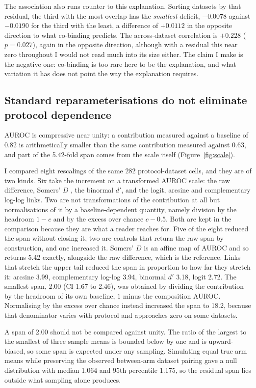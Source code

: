 The association also runs counter to this explanation. Sorting datasets by that residual, the third with the
most overlap has the \emph{smallest} deficit, $-0.0078$ against $-0.0190$ for the third with the
least, a difference of $+0.0112$ in the opposite direction to what co-binding predicts. The
across-dataset correlation is $+0.228$ ($p=0.027$), again in the opposite direction, although with a residual
this near zero throughout I would not read much into its size either. The claim I make is the
negative one: co-binding is too rare here to be the explanation, and what variation it has does
not point the way the explanation requires.

\subsection{Standard reparameterisations do not eliminate protocol dependence}
\label{sec:rescaling}

AUROC is compressive near unity: a contribution measured against a baseline of 0.82 is
arithmetically smaller than the same contribution measured against 0.63, and part of the
5.42-fold span comes from the scale itself (Figure~\ref{fig:scale}).

I compared eight rescalings of the same 282 protocol-dataset cells, and they are of two kinds.
Six take the increment on a transformed AUROC scale: the raw difference, Somers' $D$
\citep{somers1962}, the binormal $d'$, and the logit, arcsine and complementary log-log links.
Two are not transformations of the contribution at all but normalisations of it by a
baseline-dependent quantity, namely division by the headroom $1-c$ and by the excess over
chance $c-0.5$. Both are kept in the comparison because they are what a reader reaches for.
Five of the eight reduced the span without closing it, two are controls that return the raw
span by construction, and one increased it. Somers' $D$ is an affine map of AUROC and so
returns 5.42 exactly, alongside the raw difference, which is the reference. Links that stretch the upper tail
reduced the span in proportion to how far they stretch it: arcsine 3.99, complementary log-log
3.94, binormal $d'$ 3.18, logit 2.72. The smallest span, 2.00 (CI 1.67 to 2.46), was obtained by
dividing the contribution by the headroom of its own baseline, $1$ minus the composition AUROC.
Normalising by the excess over chance instead increased the span to 18.2, because that
denominator varies with protocol and approaches zero on some datasets.

A span of 2.00 should not be compared against unity. The ratio of the largest to the smallest of
three sample means is bounded below by one and is upward-biased, so some span is expected under
any sampling. Simulating equal true arm means while preserving the observed between-arm dataset
pairing gave a null distribution with median 1.064 and 95th percentile 1.175, so the residual
span lies outside what sampling alone produces.

